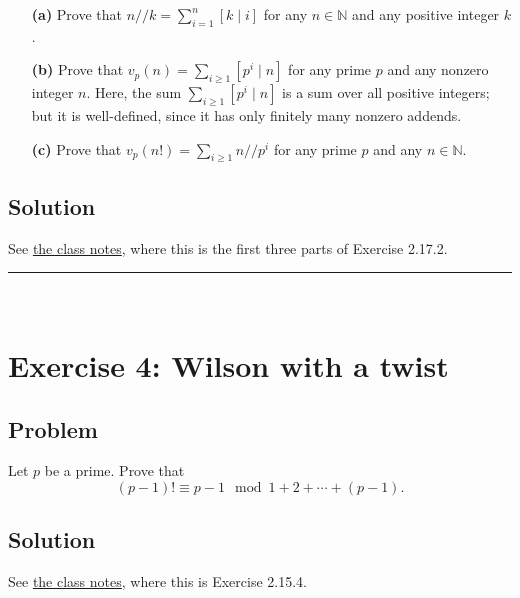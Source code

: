 \documentclass[paper=a4, fontsize=12pt]{scrartcl} %
\newcommand{\NN}{\mathbb{N}} %
\newcommand{\tup}[1]{\left( #1 \right)}
\newcommand{\ive}[1]{\left[ #1 \right]}
\newcommand{\horrule}[1]{\rule{\linewidth}{#1}} %
\let\sumnonlimits\sum
\renewcommand{\sum}{\sumnonlimits\limits}
\theoremstyle{plainsl}
\theoremstyle{definition}
\theoremstyle{remark}
\begin{document}
\begin{enumerate}

\item[\textbf{(a)}]
Prove that $n // k = \sum_{i=1}^n \ive{k \mid i}$
for any $n \in \NN$ and any positive integer $k$.

\item[\textbf{(b)}]
Prove that $v_p \tup{n} = \sum_{i \geq 1} \ive{p^i \mid n}$
for any prime $p$ and any nonzero integer $n$.
Here, the sum $\sum_{i \geq 1} \ive{p^i \mid n}$ is
a sum over all positive integers; but it is
well-defined, since it has only finitely many nonzero
addends.

\item[\textbf{(c)}]
Prove that
$v_p \tup{n!} = \sum_{i \geq 1} n // p^i$ for any
prime $p$ and any $n \in \NN$.

\end{enumerate}

\subsection{Solution}

See
\href{http://www-users.math.umn.edu/~dgrinber/19s/notes.pdf}{the class notes},
where this is the first three parts of Exercise 2.17.2.

\horrule{0.3pt} \\[0.4cm]

\section{Exercise 4: Wilson with a twist}

\subsection{Problem}

Let $p$ be a prime.
Prove that
\[
\tup{p-1}! \equiv p-1
\mod 1 + 2 + \cdots + \tup{p-1} .
\]

\subsection{Solution}

See
\href{http://www-users.math.umn.edu/~dgrinber/19s/notes.pdf}{the class notes},
where this is Exercise 2.15.4.
\end{document}
